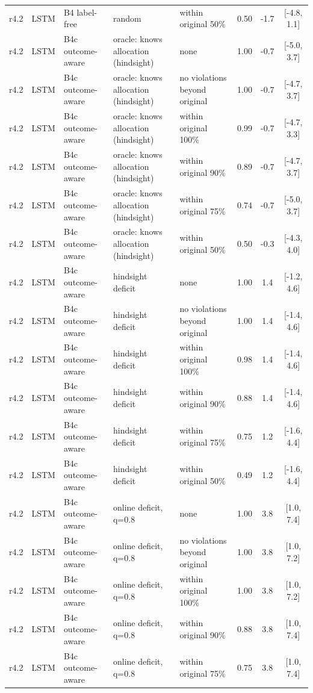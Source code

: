 \begin{longtable}{lllp{4.2cm}p{3.4cm}ccc}
r4.2 & LSTM & B4 label-free & random & within original 50\% & 0.50 & -1.7 & [-4.8, 1.1] \\
r4.2 & LSTM & B4c outcome-aware & oracle: knows allocation (hindsight) & none & 1.00 & -0.7 & [-5.0, 3.7] \\
r4.2 & LSTM & B4c outcome-aware & oracle: knows allocation (hindsight) & no violations beyond original & 1.00 & -0.7 & [-4.7, 3.7] \\
r4.2 & LSTM & B4c outcome-aware & oracle: knows allocation (hindsight) & within original 100\% & 0.99 & -0.7 & [-4.7, 3.3] \\
r4.2 & LSTM & B4c outcome-aware & oracle: knows allocation (hindsight) & within original 90\% & 0.89 & -0.7 & [-4.7, 3.7] \\
r4.2 & LSTM & B4c outcome-aware & oracle: knows allocation (hindsight) & within original 75\% & 0.74 & -0.7 & [-5.0, 3.7] \\
r4.2 & LSTM & B4c outcome-aware & oracle: knows allocation (hindsight) & within original 50\% & 0.50 & -0.3 & [-4.3, 4.0] \\
r4.2 & LSTM & B4c outcome-aware & hindsight deficit & none & 1.00 & 1.4 & [-1.2, 4.6] \\
r4.2 & LSTM & B4c outcome-aware & hindsight deficit & no violations beyond original & 1.00 & 1.4 & [-1.4, 4.6] \\
r4.2 & LSTM & B4c outcome-aware & hindsight deficit & within original 100\% & 0.98 & 1.4 & [-1.4, 4.6] \\
r4.2 & LSTM & B4c outcome-aware & hindsight deficit & within original 90\% & 0.88 & 1.4 & [-1.4, 4.6] \\
r4.2 & LSTM & B4c outcome-aware & hindsight deficit & within original 75\% & 0.75 & 1.2 & [-1.6, 4.4] \\
r4.2 & LSTM & B4c outcome-aware & hindsight deficit & within original 50\% & 0.49 & 1.2 & [-1.6, 4.4] \\
r4.2 & LSTM & B4c outcome-aware & online deficit, q=0.8 & none & 1.00 & 3.8 & [1.0, 7.4] \\
r4.2 & LSTM & B4c outcome-aware & online deficit, q=0.8 & no violations beyond original & 1.00 & 3.8 & [1.0, 7.2] \\
r4.2 & LSTM & B4c outcome-aware & online deficit, q=0.8 & within original 100\% & 1.00 & 3.8 & [1.0, 7.2] \\
r4.2 & LSTM & B4c outcome-aware & online deficit, q=0.8 & within original 90\% & 0.88 & 3.8 & [1.0, 7.4] \\
r4.2 & LSTM & B4c outcome-aware & online deficit, q=0.8 & within original 75\% & 0.75 & 3.8 & [1.0, 7.4] \\

\end{longtable}
